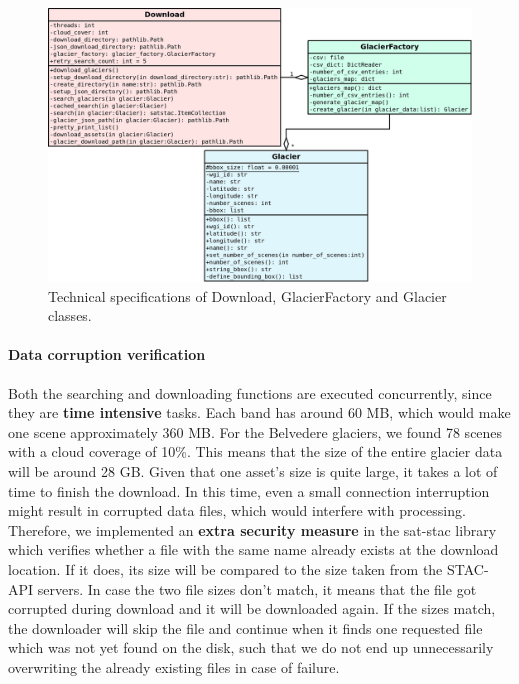 \documentclass[12pt, a4paper]{report}
\begin{document}
	\begin{figure}[h]
		\centering
		\includegraphics[scale=0.23]{../images/sd_diagram.png}
		\caption{Technical specifications of Download, GlacierFactory and Glacier classes.}
		\label{fig:sd_diagram}
	\end{figure}

	\paragraph{Data corruption verification}
	Both the searching and downloading functions are executed concurrently, since they are \textbf{time intensive} tasks. Each band has around 60 MB, which would make one scene approximately 360 MB. For the Belvedere glaciers, we found 78 scenes with a cloud coverage of 10\%. This means that the size of the entire glacier data will be around 28 GB. Given that one asset's size is quite large, it takes a lot of time to finish the download. In this time, even a small connection interruption might result in corrupted data files, which would interfere with processing. Therefore, we implemented an \textbf{extra security measure} in the sat-stac library which verifies whether a file with the same name already exists at the download location. If it does, its size will be compared to the size taken from the STAC-API servers. In case the two file sizes don't match, it means that the file got corrupted during download and it will be downloaded again. If the sizes match, the downloader will skip the file and continue when it finds one requested file which was not yet found on the disk, such that we do not end up unnecessarily overwriting the already existing files in case of failure.
	
\end{document}
